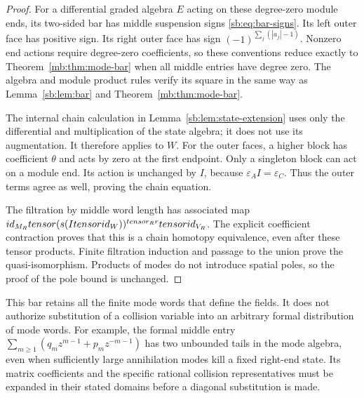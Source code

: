 \begin{proof}
For a differential graded algebra \(E\) acting on these degree-zero
module ends, its two-sided bar has middle suspension signs
\eqref{sb:eq:bar-signs}.  Its left outer face has positive sign.
Its right outer face has sign
\((-1)^{\sum_j(|a_j|-1)}\).  Nonzero end actions require
degree-zero coefficients, so these conventions reduce exactly to
Theorem~\ref{mb:thm:mode-bar} when all middle entries have degree zero.
The algebra and module product rules verify its square in the same
way as Lemma~\ref{sb:lem:bar} and Theorem~\ref{mb:thm:mode-bar}.

The internal chain calculation in Lemma~\ref{sb:lem:state-extension}
uses only the differential and multiplication of the state algebra;
it does not use its augmentation.  It therefore applies to \(W\).
For the outer faces, a higher block has coefficient \(\theta\)
and acts by zero at the first endpoint.  Only a singleton block can
act on a module end.  Its action is unchanged by \(I\), because
\(\varepsilon_A I=\varepsilon_C\).
Thus the outer terms agree as well, proving the chain equation.

The filtration by middle word length has associated map
\(id_{M_R}tensor(s(Itensorid_W))^{tensor_R r}
 tensorid_{V_R}\).
The explicit coefficient contraction proves that this is a chain
homotopy equivalence, even after these tensor products.
Finite filtration induction and passage to the union prove the
quasi-isomorphism.  Products of modes do not introduce spatial poles,
so the proof of the pole bound is unchanged.
\end{proof}

This bar retains all the finite mode words that define the fields.
It does not authorize substitution of a collision variable into an
arbitrary formal distribution of mode words.  For example, the formal
middle entry \(\sum_{m\ge1}(q_mz^{m-1}+p_mz^{-m-1})\) has two unbounded
tails in the mode algebra, even when sufficiently large annihilation
modes kill a fixed right-end state.  Its matrix coefficients and the
specific rational collision representatives must be expanded in their
stated domains before a diagonal substitution is made.
